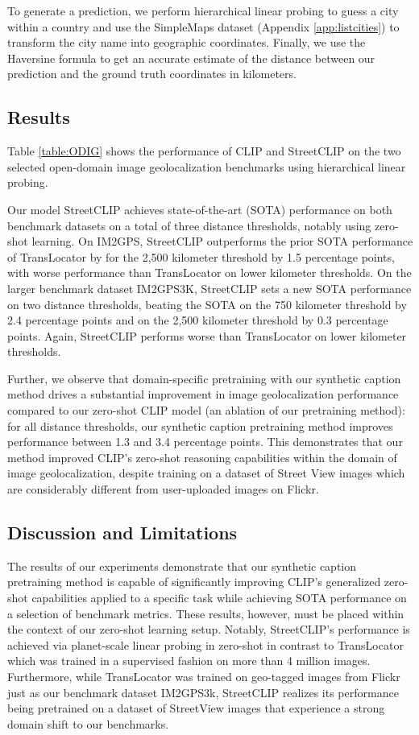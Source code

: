 \documentclass{article}
\begin{document}
To generate a prediction, we perform hierarchical linear probing to guess a city within a country and use the SimpleMaps dataset (Appendix \ref{app:listcities}) to transform the city name into geographic coordinates. Finally, we use the Haversine formula to get an accurate estimate of the distance between our prediction and the ground truth coordinates in kilometers.

\subsection{Results}
Table \ref{table:ODIG} shows the performance of CLIP and StreetCLIP on the two selected open-domain image geolocalization benchmarks using hierarchical linear probing.

Our model StreetCLIP achieves state-of-the-art (SOTA) performance on both benchmark datasets on a total of three distance thresholds, notably using zero-shot learning. On IM2GPS, StreetCLIP outperforms the prior SOTA performance of TransLocator by \citet{pramanick_2022} for the 2,500 kilometer threshold by 1.5 percentage points, with worse performance than TransLocator on lower kilometer thresholds. On the larger benchmark dataset IM2GPS3K, StreetCLIP sets a new SOTA performance on two distance thresholds, beating the SOTA on the 750 kilometer threshold by 2.4 percentage points and on the 2,500 kilometer threshold by 0.3 percentage points. Again, StreetCLIP performs worse than TransLocator on lower kilometer thresholds. 

Further, we observe that domain-specific pretraining with our synthetic caption method drives a substantial improvement in image geolocalization performance compared to our zero-shot CLIP model (an ablation of our pretraining method): for all distance thresholds, our synthetic caption pretraining method improves performance between 1.3 and 3.4 percentage points. This demonstrates that our method improved CLIP's zero-shot reasoning capabilities within the domain of image geolocalization, despite training on a dataset of Street View images which are considerably different from user-uploaded images on Flickr. 

\subsection{Discussion and Limitations}

The results of our experiments demonstrate that our synthetic caption pretraining method is capable of significantly improving CLIP's generalized zero-shot capabilities applied to a specific task while achieving SOTA performance on a selection of benchmark metrics. These results, however, must be placed within the context of our zero-shot learning setup. Notably, StreetCLIP's performance is achieved via planet-scale linear probing in zero-shot in contrast to TransLocator which was trained in a supervised fashion on more than 4 million images. Furthermore, while TransLocator was trained on geo-tagged images from Flickr just as our benchmark dataset IM2GPS3k, StreetCLIP realizes its performance being 
pretrained on a dataset of StreetView images that experience a strong domain shift to our benchmarks.
\end{document}
